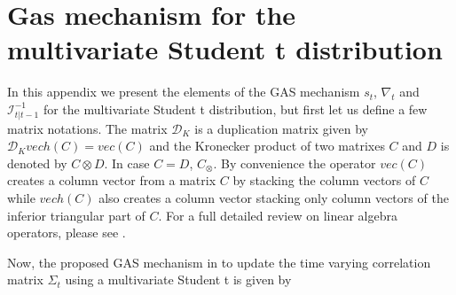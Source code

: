 \documentclass[a4paper]{IEEEtran}
\begin{document}


\appendices

\section{Gas mechanism for the multivariate Student t distribution}\label{FirstAppendix}

In this appendix we present the elements of the GAS mechanism $s_t$, $\nabla_{t}$ and $\mathcal{I}_{t|t-1}^{-1}$ for the multivariate Student t distribution, but first let us define a few matrix notations. The matrix $\mathcal{D}_{K}$ is a duplication matrix given by $\mathcal{D}_{K}vech(C) = vec(C)$ and the Kronecker product of two matrixes $C$ and $D$ is denoted by $C \otimes D$. In case $C=D$, $C_{\otimes}$. By convenience the operator $vec(C)$ creates a column vector from a matrix $C$ by stacking the column vectors of $C$ while $vech(C)$ also creates a column vector stacking only column vectors of the inferior triangular part of $C$. For a full detailed review on linear algebra operators, please see \cite{abadir2005matrix}.

Now, the proposed GAS mechanism in\cite{creal2011dynamic} to update the time varying correlation matrix $\Sigma_t$ using a multivariate Student t is given by 
  
\end{document}
